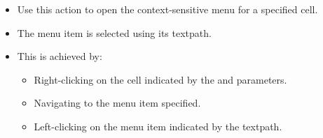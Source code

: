 
\begin{itemize}
\item Use this action to open the context-sensitive menu for a specified cell.
\item The menu item is selected using its textpath. 
\item This is achieved by:
\begin{itemize}
\item Right-clicking on the cell indicated by the  and
   parameters.
\item Navigating to the menu item specified.
\item Left-clicking on the menu item indicated by the textpath.  
\end{itemize}
 \end{itemize}


